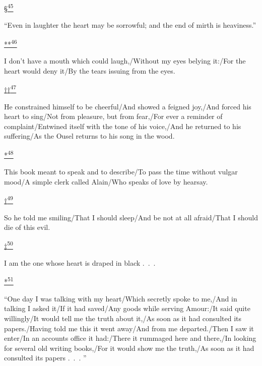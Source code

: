 \protect\hypertarget{23_NOTES.xhtmlux5cux23id_2864}{\protect\hyperlink{21_Chapter_Thirteen__IMAGE_AND_WORD.xhtmlux5cux23id_2863}{§\textsuperscript{45}}}
``Even in laughter the heart may be sorrowful; and the end of mirth is
heaviness.''

\protect\hypertarget{23_NOTES.xhtmlux5cux23id_2862}{\protect\hyperlink{21_Chapter_Thirteen__IMAGE_AND_WORD.xhtmlux5cux23id_2861}{**\textsuperscript{46}}}
I don't have a mouth which could laugh,/Without my eyes belying it:/For
the heart would deny it/By the tears issuing from the eyes.

\protect\hypertarget{23_NOTES.xhtmlux5cux23id_2860}{\protect\hyperlink{21_Chapter_Thirteen__IMAGE_AND_WORD.xhtmlux5cux23id_2859}{††\textsuperscript{47}}}
He constrained himself to be cheerful/And showed a feigned joy,/And
forced his heart to sing/Not from pleasure, but from fear,/For ever a
reminder of complaint/Entwined itself with the tone of his voice,/And he
returned to his suffering/As the Ousel returns to his song in the wood.

\protect\hypertarget{23_NOTES.xhtmlux5cux23id_2858}{\protect\hyperlink{21_Chapter_Thirteen__IMAGE_AND_WORD.xhtmlux5cux23id_2857}{*\textsuperscript{48}}}
This book meant to speak and to describe/To pass the time without vulgar
mood/A simple clerk called Alain/Who speaks of love by hearsay.

\protect\hypertarget{23_NOTES.xhtmlux5cux23id_2856}{\protect\hyperlink{21_Chapter_Thirteen__IMAGE_AND_WORD.xhtmlux5cux23id_2855}{†\textsuperscript{49}}}
So he told me smiling/That I should sleep/And be not at all afraid/That
I should die of this evil.

\protect\hypertarget{23_NOTES.xhtmlux5cux23id_2854}{\protect\hyperlink{21_Chapter_Thirteen__IMAGE_AND_WORD.xhtmlux5cux23id_2853}{‡\textsuperscript{50}}}
I am the one whose heart is draped in black .~.~.

\protect\hypertarget{23_NOTES.xhtmlux5cux23id_2852}{\protect\hyperlink{21_Chapter_Thirteen__IMAGE_AND_WORD.xhtmlux5cux23id_2851}{*\textsuperscript{51}}}
``One day I was talking with my heart/Which secretly spoke to me,/And in
talking I asked it/If it had saved/Any goods while serving Amour:/It
said quite willingly/It would tell me the truth about it,/As soon as it
had consulted its papers./Having told me this it went away/And from me
departed./Then I saw it enter/In an accounts office it had:/There it
rummaged here and there,/In looking for several old writing books,/For
it would show me the truth,/As soon as it had consulted its papers .~.~.
''

